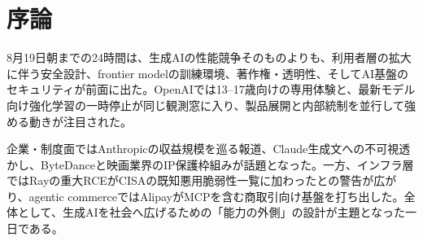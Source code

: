 \section*{序論}
8月19日朝までの24時間は、生成AIの性能競争そのものよりも、利用者層の拡大に伴う安全設計、frontier modelの訓練環境、著作権・透明性、そしてAI基盤のセキュリティが前面に出た。OpenAIでは13--17歳向けの専用体験と、最新モデル向け強化学習の一時停止が同じ観測窓に入り、製品展開と内部統制を並行して強める動きが注目された。

企業・制度面ではAnthropicの収益規模を巡る報道、Claude生成文への不可視透かし、ByteDanceと映画業界のIP保護枠組みが話題となった。一方、インフラ層ではRayの重大RCEがCISAの既知悪用脆弱性一覧に加わったとの警告が広がり、agentic commerceではAlipayがMCPを含む商取引向け基盤を打ち出した。全体として、生成AIを社会へ広げるための「能力の外側」の設計が主題となった一日である。
